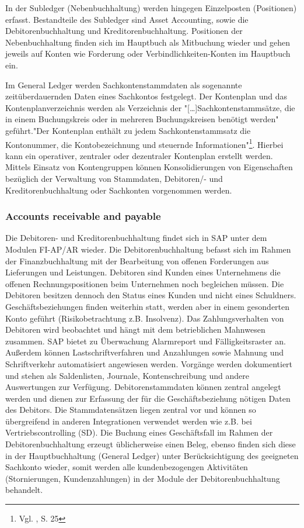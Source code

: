 In der Subledger (Nebenbuchhaltung) werden hingegen Einzelposten (Positionen) erfasst. Bestandteile des Subledger sind Asset Accounting, sowie die Debitorenbuchhaltung und Kreditorenbuchhaltung. Positionen der Nebenbuchhaltung finden sich im Hauptbuch als Mitbuchung wieder und gehen jeweils auf Konten wie Forderung oder Verbindlichkeiten-Konten im Hauptbuch ein.

Im General Ledger werden Sachkontenstammdaten als sogenannte zeitüberdauernden Daten eines Sachkontos festgelegt. Der Kontenplan und das Kontenplanverzeichnis werden als Verzeichnis der "[…]Sachkontenstammsätze, die in einem Buchungskreis oder in mehreren Buchungskreisen benötigt werden" geführt."Der Kontenplan enthält zu jedem Sachkontenstammsatz die Kontonummer, die Kontobezeichnung und steuernde Informationen"\footnote{Vgl. \cite{SAPFIGL}, S. 25}. Hierbei kann ein operativer, zentraler oder dezentraler Kontenplan erstellt werden. Mittels Einsatz von Kontengruppen können Konsolidierungen von Eigenschaften bezüglich der Verwaltung von Stammdaten, Debitoren/- und Kreditorenbuchhaltung oder Sachkonten vorgenommen werden.


\subsubsection{Accounts receivable and payable} %
Die Debitoren- und Kreditorenbuchhaltung findet sich in SAP unter dem Modulen FI-AP/AR wieder.
Die Debitorenbuchhaltung befasst sich im Rahmen der Finanzbuchhaltung mit der Bearbeitung von offenen Forderungen aus Lieferungen und Leistungen. Debitoren sind Kunden eines Unternehmens die offenen Rechnungspositionen beim Unternehmen noch begleichen müssen. Die Debitoren besitzen dennoch den Status eines Kunden und nicht eines Schuldners. Geschäftsbeziehungen finden weiterhin statt, werden aber in einem gesonderten Konto geführt (Risikobetrachtung z.B. Insolvenz). Das Zahlungsverhalten von Debitoren wird beobachtet und hängt mit dem betrieblichen Mahnwesen zusammen. SAP bietet zu Überwachung Alarmreport und Fälligkeitsraster an. Außerdem können Lastschriftverfahren und Anzahlungen sowie Mahnung und Schriftverkehr automatisiert angewiesen werden. Vorgänge werden dokumentiert und stehen als Saldenlisten, Journale, Kontenschreibung und andere Auswertungen zur Verfügung. Debitorenstammdaten können zentral angelegt werden und dienen zur Erfassung der für die Geschäftsbeziehung nötigen Daten des Debitors. Die Stammdatensätzen liegen zentral vor und können so übergreifend in anderen Integrationen verwendet werden wie z.B. bei Vertriebscontrolling (SD). Die Buchung eines Geschäftsfall im Rahmen der Debitorenbuchhaltung erzeugt üblicherweise einen Beleg, ebenso finden sich diese in der Hauptbuchhaltung (General Ledger) unter Berücksichtigung des geeigneten Sachkonto wieder, somit werden alle kundenbezogengen Aktivitäten (Stornierungen, Kundenzahlungen) in der Module der Debitorenbuchhaltung behandelt. 

